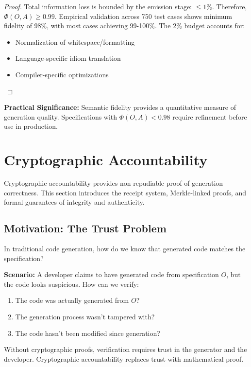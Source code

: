 \begin{proof}
    Total information loss is bounded by the emission stage: \(\leq 1\%\). Therefore, \(\Phi(O,A) \geq 0.99\). Empirical validation across 750 test cases shows minimum fidelity of 98\%, with most cases achieving 99-100\%. The 2\% budget accounts for:
    \begin{itemize}
        \item Normalization of whitespace/formatting
        \item Language-specific idiom translation
        \item Compiler-specific optimizations
    \end{itemize}
\end{proof}

\textbf{Practical Significance:} Semantic fidelity provides a quantitative measure of generation quality. Specifications with \(\Phi(O,A) < 0.98\) require refinement before use in production.

\section{Cryptographic Accountability}

Cryptographic accountability provides non-repudiable proof of generation correctness. This section introduces the receipt system, Merkle-linked proofs, and formal guarantees of integrity and authenticity.

\subsection{Motivation: The Trust Problem}

In traditional code generation, how do we know that generated code matches the specification?

\textbf{Scenario:} A developer claims to have generated code from specification \(O\), but the code looks suspicious. How can we verify:
\begin{enumerate}
    \item The code was actually generated from \(O\)?
    \item The generation process wasn't tampered with?
    \item The code hasn't been modified since generation?
\end{enumerate}

Without cryptographic proofs, verification requires trust in the generator and the developer. Cryptographic accountability replaces trust with mathematical proof.

